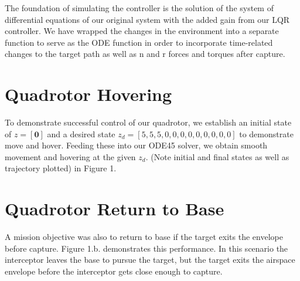 \documentclass{article}
\begin{document}
\begin{multicols}{2}
\noindent
The foundation of simulating the controller is the solution of the system of differential equations of our original system with the added gain from our LQR controller.  We have wrapped the changes in the environment into a separate function to serve as the ODE function in order to incorporate time-related changes to the target path as well as n and r forces and torques after capture.
\section*{Quadrotor Hovering}
To demonstrate successful control of our quadrotor, we establish an initial state of $z=[\mathbf{0}]$ and a desired state $z_d=[5,5,5,0,0,0,0,0,0,0,0,0] $ to demonstrate move and hover.  Feeding these into our ODE45 solver, we obtain smooth movement and hovering at the given $z_d$.  (Note initial and final states as well as trajectory plotted) in Figure 1.
\section*{Quadrotor Return to Base}
A mission objective was also to return to base if the target exits the envelope before capture.  Figure 1.b. demonstrates this performance. In this scenario the interceptor leaves the base to pursue the target, but the target exits the airspace envelope before the interceptor gets close enough to capture.


\end{multicols}
\end{document}
